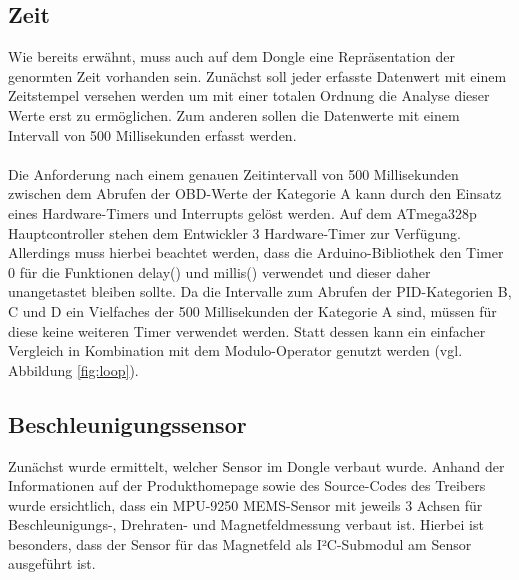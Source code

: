 \subsection{Zeit}
Wie bereits erwähnt, muss auch auf dem Dongle eine Repräsentation der genormten Zeit vorhanden sein. Zunächst soll jeder erfasste Datenwert mit einem Zeitstempel versehen werden um mit einer totalen Ordnung die Analyse dieser Werte erst zu ermöglichen. Zum anderen sollen die Datenwerte mit einem Intervall von 500 Millisekunden erfasst werden.
\paragraph{}
Die Anforderung nach einem genauen Zeitintervall von 500 Millisekunden zwischen dem Abrufen der OBD-Werte der Kategorie A kann durch den Einsatz eines Hardware-Timers und Interrupts gelöst werden.
Auf dem ATmega328p Hauptcontroller stehen dem Entwickler 3 Hardware-Timer zur Verfügung. Allerdings muss hierbei beachtet werden, dass die Arduino-Bibliothek den Timer 0 für die Funktionen delay() und millis() verwendet und dieser daher unangetastet bleiben sollte.\cite{arduinoTimer}
Da die Intervalle zum Abrufen der PID-Kategorien B, C und D ein Vielfaches der 500 Millisekunden der Kategorie A sind, müssen für diese keine weiteren Timer verwendet werden. Statt dessen kann ein einfacher Vergleich in Kombination mit dem Modulo-Operator genutzt werden (vgl. Abbildung \ref{fig:loop}).
\subsection{Beschleunigungssensor}
Zunächst wurde ermittelt, welcher Sensor im Dongle verbaut wurde. Anhand der Informationen auf der Produkthomepage sowie des Source-Codes des Treibers wurde ersichtlich, dass ein MPU-9250 \ac{MEMS}-Sensor mit jeweils 3 Achsen für Beschleunigungs-, Drehraten- und Magnetfeldmessung verbaut ist. Hierbei ist besonders, dass der Sensor für das Magnetfeld als I²C-Submodul am Sensor ausgeführt ist.
